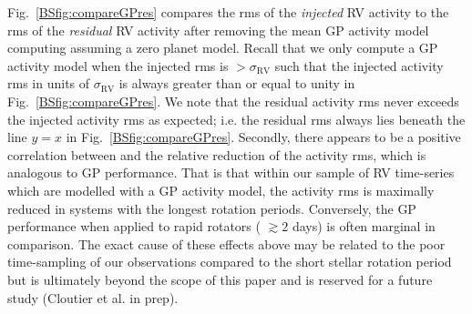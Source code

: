 Fig.~\ref{BSfig:compareGPres} compares the rms of the \emph{injected} RV activity to the rms of the \emph{residual} RV activity
after removing the mean GP activity model computing assuming a zero planet model. Recall that we only compute a GP activity model
when the injected rms is $> \sigma_{\text{RV}}$ such that the injected activity rms in units of $\sigma_{\text{RV}}$
is always greater than or equal to unity in Fig.~\ref{BSfig:compareGPres}.
We note that the residual activity rms never exceeds the injected activity rms as expected; i.e. the residual rms
always lies beneath the line $y=x$ in Fig.~\ref{BSfig:compareGPres}. Secondly,
there appears to be a positive correlation between \prot{} and the relative reduction of the activity rms,
which is analogous to GP performance. That is that within our sample of RV time-series which are modelled with a GP activity
model, the activity rms is maximally reduced in systems
with the longest rotation periods. Conversely, the GP performance when applied to rapid rotators (\prot{} $\gtrsim 2$ days)
is often marginal in comparison. The exact cause of these effects above may be related to the poor time-sampling of our
observations compared to the short stellar rotation period but is ultimately beyond the scope of this paper and is reserved
for a future study (Cloutier et al. in prep).

